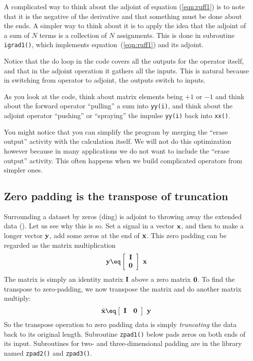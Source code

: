 A complicated way to think about the adjoint of equation
(\ref{eqn:ruff1}) is to note that it is the negative of the derivative
and that something must be done about the ends.
A simpler way to think about it
is to apply the idea that the adjoint of a sum of $N$ terms
is a collection of $N$ assignments.
This is done in subroutine \texttt{igrad1()},
which implements equation~(\ref{eqn:ruff1})
and its adjoint.
\par
\noindent
Notice that the do loop in the code
covers all the outputs for the operator itself,
and that in the adjoint operation it gathers all the inputs.
This is natural because in switching from operator
to adjoint, the outputs switch to inputs.
\par
As you look at the code,
think about matrix elements being $+1$ or $-1$ and
think about the forward operator
``pulling'' a sum into {\tt yy(i)}, and
think about the adjoint operator
``pushing'' or ``spraying'' the impulse {\tt yy(i)} back into {\tt xx()}.

\par
You might notice that you can simplify the program
by merging the ``erase output'' activity with the calculation itself.
We will not do this optimization however because in many applications
we do not want to include the ``erase output'' activity.
This often happens when we build complicated operators from simpler ones.


\subsection{Zero padding is the transpose of truncation}
Surrounding a dataset by zeros
(ding)
is adjoint to throwing away the extended data
().
Let us see why this is so.
Set a signal in a vector $\bold x$, and
then to make a longer vector $\bold y$,
add some zeros at the end of $\bold x$.
This zero padding can be regarded as the matrix multiplication
\begin{equation}
\bold y\eq
 \left[
  \begin{array}{c}
   \bold I \\
   \bold 0
  \end{array}
 \right]
 \
 \bold x
\end{equation}
The matrix is simply an identity matrix $\bold I$
above a zero matrix $\bold 0$.
To find the transpose to zero-padding, we now transpose the matrix
and do another matrix multiply:
\begin{equation}
\tilde {\bold x} \eq
 \left[
  \begin{array}{cc}
   \bold I & \bold 0
  \end{array}
 \right]
\
\bold y
\end{equation}
So the transpose operation to zero padding data
is simply {\it truncating} the data back to its original length.
Subroutine \texttt{zpad1()} below
pads zeros on both ends of its input.
Subroutines for two- and three-dimensional padding are in the
library named {\tt zpad2()} and {\tt zpad3()}.
\opdex{zpad1}{zero pad 1-D}{21}{32}{user/gee}


